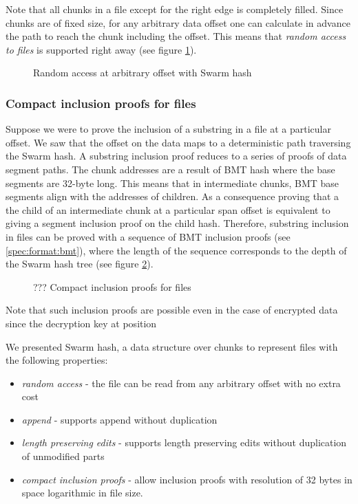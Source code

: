 Note that all chunks in a file except for the right edge is completely filled. Since chunks are of fixed size, for any arbitrary data offset one can calculate in advance the path to reach the chunk including the offset. This means that \emph{random access to files} is  supported right away (see figure \ref{fig:random-access}).


\begin{figure}[htbp]
\centering
\caption[Random access at arbitrary offset with Swarm hash]{Random access at arbitrary offset with Swarm hash}
\label{fig:random-access}
\end{figure}

\subsubsection{Compact inclusion proofs for files}

Suppose we were to prove the  inclusion of a substring in a file at a particular offset. We saw that the offset on the data maps to a deterministic path traversing the Swarm hash. A substring inclusion proof reduces to a series of proofs of data segment paths. The chunk addresses are a result of BMT hash where the base segments are 32-byte long. This means that in intermediate chunks, BMT base segments align with the addresses of children. As a consequence proving that a the child of an intermediate chunk at a particular span offset is equivalent to giving a segment inclusion proof on the child hash. Therefore, substring inclusion in files can be proved with a sequence of BMT inclusion proofs (see \ref{spec:format:bmt}), where the length of the sequence corresponds to the depth of the Swarm hash tree (see figure \ref{fig:file-inclusion}). 

\begin{figure}[htbp]
\centering
\caption[??? Compact inclusion proofs for files]{??? Compact inclusion proofs for files}
\label{fig:file-inclusion}
\end{figure}

Note that such inclusion proofs are possible even in the case of encrypted data since the decryption key at position 

We presented Swarm hash, a data structure over chunks to represent files with the following properties:

\begin{itemize}
    \item \emph{random access} - the file can be read from any arbitrary offset with no extra cost
    \item \emph{append} - supports append without duplication 
    \item \emph{length preserving edits} - supports length preserving edits without duplication of unmodified parts
    \item \emph{compact inclusion proofs} - allow inclusion proofs with resolution of 32 bytes in space logarithmic in file size.
\end{itemize}



